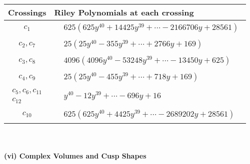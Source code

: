 \documentclass[1p]{elsarticle_modified}
\theoremstyle{definition}
\begin{document}
\begin{tabular}{m{50pt}|m{274pt}}
Crossings & \hspace{64pt}Riley Polynomials at each crossing \\
\hline $$\begin{aligned}c_{1}\end{aligned}$$&$\begin{aligned}
&625(625 y^{40}+14425 y^{39}+\cdots-2166706 y+28561)
\end{aligned}$\\
\hline $$\begin{aligned}c_{2},c_{7}\end{aligned}$$&$\begin{aligned}
&25(25 y^{40}-355 y^{39}+\cdots+2766 y+169)
\end{aligned}$\\
\hline $$\begin{aligned}c_{3},c_{8}\end{aligned}$$&$\begin{aligned}
&4096(4096 y^{40}-53248 y^{39}+\cdots-13450 y+625)
\end{aligned}$\\
\hline $$\begin{aligned}c_{4},c_{9}\end{aligned}$$&$\begin{aligned}
&25(25 y^{40}-455 y^{39}+\cdots+718 y+169)
\end{aligned}$\\
\hline $$\begin{aligned}c_{5},c_{6},c_{11}\\c_{12}\end{aligned}$$&$\begin{aligned}
&y^{40}-12 y^{39}+\cdots-696 y+16
\end{aligned}$\\
\hline $$\begin{aligned}c_{10}\end{aligned}$$&$\begin{aligned}
&625(625 y^{40}+4425 y^{39}+\cdots-2689202 y+28561)
\end{aligned}$\\
\hline
\end{tabular}\\~\\
\newpage\flushleft \textbf{(vi) Complex Volumes and Cusp Shapes}
\end{document}
